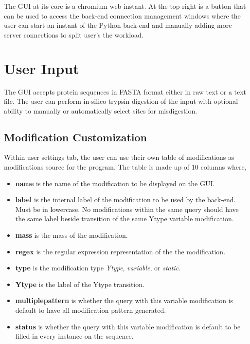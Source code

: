 \documentclass[..\manual.tex]{subfiles}
\begin{document}
The GUI at its core is a chromium web instant. At the top right is a button that can be used to access the back-end connection management windows where the user can start an instant of the Python back-end and manually adding more server connections to split user's the workload.\par

\section{User Input}
The GUI accepts protein sequences in FASTA format either in raw text or a text file. The user can perform in-silico trypsin digestion of the input with optional ability to manually or automatically select sites for misdigestion.

\subsection{Modification Customization}
Within user settings tab, the user can use their own table of modifications as modifications source for the program. The table is made up of 10 columns where,
\begin{itemize}
    \item \textbf{name} is the name of the modification to be displayed on the GUI.
    \item \textbf{label} is the internal label of the modification to be used by the back-end. Must be in lowercase. No modifications within the same query should have the same label beside transition of the same Ytype variable modification.
    \item \textbf{mass} is the mass of the modification.
    \item \textbf{regex} is the regular expression representation of the the modification.
    \item \textbf{type} is the modification type \emph{Ytype}, \emph{variable}, or \emph{static}.
    \item \textbf{Ytype} is the label of the Ytype transition.
    \item \textbf{multiplepattern} is whether the query with this variable modification is default to have all modification pattern generated.
    \item \textbf{status} is whether the query with this variable modification is default to be filled in every instance on the sequence.
\end{itemize}
\end{document}
